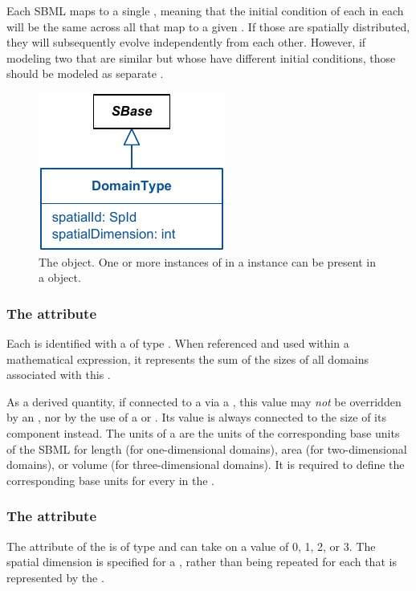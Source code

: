 Each SBML \Compartment maps to a single \DomainType, meaning that the initial condition of each \Species in each \Compartment will be the same across all \Domains that map to a given \DomainType.  If those \Species are spatially distributed, they will subsequently evolve independently from each other.  However, if modeling two \Domains that are similar but whose \Species have different initial conditions, those \Domains should be modeled as separate \DomainTypes.

\begin{figure}[ht]
  \includegraphics{figs/DomainType-uml}
  \caption{The \DomainType object. One or more instances of \DomainType in a \ListOfDomainTypes instance can be present in a \Geometry object.}
  \label{DomainType-uml}
\end{figure}

\subsubsection{The  attribute}
Each \DomainType is identified with a  of type .  When referenced and used within a mathematical expression, it represents the sum of the sizes of all domains associated with this \DomainType.

As a derived quantity, if connected to a \Parameter via a \SpatialSymbolReference, this value may \emph{not} be overridden by an \InitialAssignment, nor by the use of a \Rule or \Event.  Its value is always connected to the size of its component \Domains instead.  The units of a \DomainType are the units of the corresponding base units of the SBML \Model for length (for one-dimensional domains), area (for two-dimensional domains), or volume (for three-dimensional domains).  It is required to define the corresponding base units for every \DomainType in the \Model.

\subsubsection{The  attribute}
The  attribute of the \DomainType is of type  and can take on a value of 0, 1, 2, or 3. The spatial dimension is specified for a \DomainType, rather than being repeated for each \Domain that is represented by the \DomainType.

